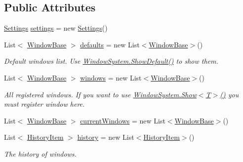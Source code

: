 \subsection*{Public Attributes}
\begin{DoxyCompactItemize}
\item 
\hyperlink{class_unity_engine_1_1_u_i_1_1_windows_1_1_window_system_1_1_settings}{Settings} \hyperlink{class_unity_engine_1_1_u_i_1_1_windows_1_1_window_system_a9684d30df14f900cca74b5629557379c}{settings} = new \hyperlink{class_unity_engine_1_1_u_i_1_1_windows_1_1_window_system_1_1_settings}{Settings}()
\item 
List$<$ \hyperlink{class_unity_engine_1_1_u_i_1_1_windows_1_1_window_base}{Window\+Base} $>$ \hyperlink{class_unity_engine_1_1_u_i_1_1_windows_1_1_window_system_abdcb5dd596ef5bb7bdf031372b1b496e}{defaults} = new List$<$\hyperlink{class_unity_engine_1_1_u_i_1_1_windows_1_1_window_base}{Window\+Base}$>$()
\begin{DoxyCompactList}\small\item\em Default windows list. Use \hyperlink{class_unity_engine_1_1_u_i_1_1_windows_1_1_window_system_afd54c11d5e6a149247a186ca0cf9c950}{Window\+System.\+Show\+Default()} to show them. \end{DoxyCompactList}\item 
List$<$ \hyperlink{class_unity_engine_1_1_u_i_1_1_windows_1_1_window_base}{Window\+Base} $>$ \hyperlink{class_unity_engine_1_1_u_i_1_1_windows_1_1_window_system_a3382b0e8d83b6c4dda24210aab3619ad}{windows} = new List$<$\hyperlink{class_unity_engine_1_1_u_i_1_1_windows_1_1_window_base}{Window\+Base}$>$()
\begin{DoxyCompactList}\small\item\em All registered windows. If you want to use \hyperlink{class_unity_engine_1_1_u_i_1_1_windows_1_1_window_system_a13b9f3a4c5884c3a2b306e018e0cd457}{Window\+System.\+Show$<$\+T$>$()} you must register window here. \end{DoxyCompactList}\item 
List$<$ \hyperlink{class_unity_engine_1_1_u_i_1_1_windows_1_1_window_base}{Window\+Base} $>$ \hyperlink{class_unity_engine_1_1_u_i_1_1_windows_1_1_window_system_abbd4d2adce8e846491fdcde2bbd09606}{current\+Windows} = new List$<$\hyperlink{class_unity_engine_1_1_u_i_1_1_windows_1_1_window_base}{Window\+Base}$>$()
\item 
List$<$ \hyperlink{class_unity_engine_1_1_u_i_1_1_windows_1_1_window_system_1_1_history_item}{History\+Item} $>$ \hyperlink{class_unity_engine_1_1_u_i_1_1_windows_1_1_window_system_a40452df5c3dc4b7c53c9fe505166fac3}{history} = new List$<$\hyperlink{class_unity_engine_1_1_u_i_1_1_windows_1_1_window_system_1_1_history_item}{History\+Item}$>$()
\begin{DoxyCompactList}\small\item\em The history of windows. \end{DoxyCompactList}\end{DoxyCompactItemize}
